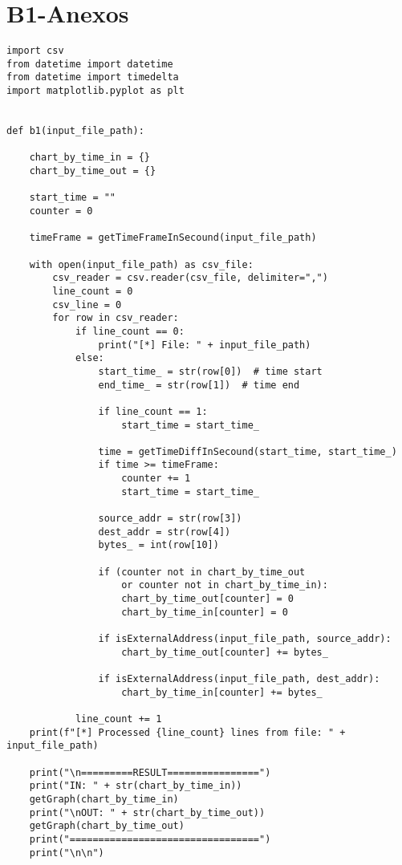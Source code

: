 \chapter{B1-Anexos}
\begin{lstlisting}
import csv
from datetime import datetime
from datetime import timedelta
import matplotlib.pyplot as plt


def b1(input_file_path):

    chart_by_time_in = {}
    chart_by_time_out = {}

    start_time = ""
    counter = 0

    timeFrame = getTimeFrameInSecound(input_file_path)

    with open(input_file_path) as csv_file:
        csv_reader = csv.reader(csv_file, delimiter=",")
        line_count = 0
        csv_line = 0
        for row in csv_reader:
            if line_count == 0:
                print("[*] File: " + input_file_path)
            else:
                start_time_ = str(row[0])  # time start
                end_time_ = str(row[1])  # time end

                if line_count == 1:
                    start_time = start_time_

                time = getTimeDiffInSecound(start_time, start_time_)
                if time >= timeFrame:
                    counter += 1
                    start_time = start_time_

                source_addr = str(row[3])
                dest_addr = str(row[4])
                bytes_ = int(row[10])

                if (counter not in chart_by_time_out 
                    or counter not in chart_by_time_in):
                    chart_by_time_out[counter] = 0
                    chart_by_time_in[counter] = 0

                if isExternalAddress(input_file_path, source_addr):
                    chart_by_time_out[counter] += bytes_

                if isExternalAddress(input_file_path, dest_addr):
                    chart_by_time_in[counter] += bytes_

            line_count += 1
    print(f"[*] Processed {line_count} lines from file: " + input_file_path)

    print("\n=========RESULT================")
    print("IN: " + str(chart_by_time_in))
    getGraph(chart_by_time_in)
    print("\nOUT: " + str(chart_by_time_out))
    getGraph(chart_by_time_out)
    print("=================================")
    print("\n\n")



\end{lstlisting}
